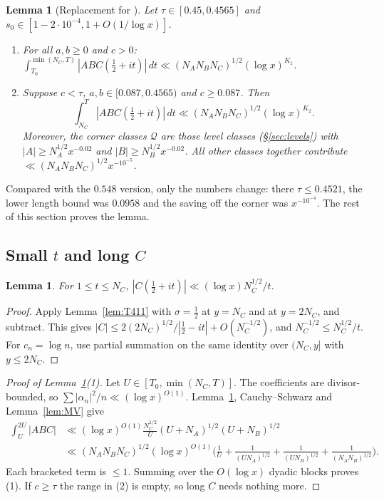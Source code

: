 \documentclass[11pt]{amsart}
\newtheorem{lemma}[theorem]{Lemma}
\theoremstyle{definition}
\theoremstyle{remark}
\newcommand{\cQ}{\mathcal{Q}}
\newcommand{\Lfp}{Lemma~\ref{lem:L44}}
\begin{document}
\begin{lemma}[Replacement for {\cite[Lemma~4.4]{MT}}]\label{lem:L44}
Let $\tau\in[0.45,0.4565]$ and $s_0\in[1-2\cdot10^{-4},1+O(1/\log x)]$.
\begin{enumerate}[label=(\arabic*),leftmargin=*]
\item For all $a,b\ge0$ and $c>0$: $\int_{T_0}^{\min(N_C,T)}|ABC(\frac12+it)|\,dt\ll(N_AN_BN_C)^{1/2}(\log x)^{K_1}$.
\item Suppose $c<\tau$, $a,b\in[0.087,0.4565)$ and $c\ge0.087$. Then
\[\int_{N_C}^{T}|ABC(\tfrac12+it)|\,dt\ll(N_AN_BN_C)^{1/2}(\log x)^{K_2}.\]
Moreover, the corner classes $\cQ$ are those level classes (\S\ref{sec:levels}) with $|A|\ge N_A^{1/2}x^{-0.02}$ and $|B|\ge N_B^{1/2}x^{-0.02}$.
All other classes together contribute $\ll(N_AN_BN_C)^{1/2}x^{-10^{-5}}$.
\end{enumerate}
\end{lemma}

Compared with the $0.548$ version, only the numbers change: there $\tau\le0.4521$, the lower length bound was $0.0958$ and the saving off the
corner was $x^{-10^{-4}}$. The rest of this section proves the lemma.

\subsection{Small $t$ and long $C$}\label{sec:short}

\begin{lemma}\label{lem:Csmall}
For $1\le t\le N_C$, $|C(\frac12+it)|\ll(\log x)N_C^{1/2}/t$.
\end{lemma}
\begin{proof}
Apply Lemma~\ref{lem:T411} with $\sigma=\frac12$ at $y=N_C$ and at $y=2N_C$, and subtract. This gives
$|C|\le 2(2N_C)^{1/2}/|\frac12-it|+O(N_C^{-1/2})$, and $N_C^{-1/2}\le N_C^{1/2}/t$. For $c_n=\log n$, use partial summation on the same
identity over $(N_C,y]$ with $y\le2N_C$.
\end{proof}

\begin{proof}[Proof of \Lfp(1)]
Let $U\in[T_0,\min(N_C,T)]$. The coefficients are divisor-bounded, so $\sum|\alpha_n|^2/n\ll(\log x)^{O(1)}$.
Lemma~\ref{lem:Csmall}, Cauchy--Schwarz and Lemma~\ref{lem:MV} give
\begin{align*}
\int_U^{2U}|ABC|&\ll(\log x)^{O(1)}\frac{N_C^{1/2}}{U}(U+N_A)^{1/2}(U+N_B)^{1/2}\\
&\ll(N_AN_BN_C)^{1/2}(\log x)^{O(1)}\Big(\frac1U+\frac{1}{(UN_A)^{1/2}}+\frac1{(UN_B)^{1/2}}+\frac1{(N_AN_B)^{1/2}}\Big).
\end{align*}
Each bracketed term is $\le1$. Summing over the $O(\log x)$ dyadic blocks proves (1). If $c\ge\tau$ the range in (2) is empty, so
long $C$ needs nothing more.
\end{proof}
\end{document}
